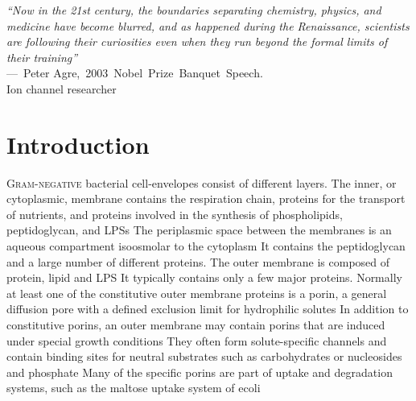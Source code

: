 \acresetall
{}
\begin{epigraph}
\emph{``Now in the 21st century, the boundaries separating chemistry, physics, and medicine have become blurred, and as happened during the Renaissance, scientists are following their curiosities even when they run beyond the formal limits of their training''}\\---~Peter Agre,~2003~Nobel~Prize~Banquet~Speech.\\  Ion channel researcher
\end{epigraph}

\section{Introduction} %
\label{sec:porin_introduction} 
\lettrine[lines=2]{G}{ram-negative} bacterial cell-envelopes consist of different layers. The inner, or cytoplasmic, membrane contains the respiration chain, proteins for the transport of nutrients, and proteins involved in the synthesis of phospholipids, peptidoglycan, and \acp{LPS} The periplasmic space between the membranes is an aqueous compartment isoosmolar to the cytoplasm It contains the peptidoglycan and a large number of different proteins. The outer membrane is composed of protein, lipid and \ac{LPS} It typically contains only a few major proteins. Normally at least one of the constitutive outer membrane proteins is a porin, a general diffusion pore with a defined exclusion limit for hydrophilic solutes In addition to constitutive porins, an outer membrane may contain porins that are induced under special growth conditions They often form solute-specific channels and contain binding sites for neutral substrates such as carbohydrates or nucleosides and phosphate Many of the specific porins are part of uptake and degradation systems, such as the maltose uptake system of \ac{ecoli} 

